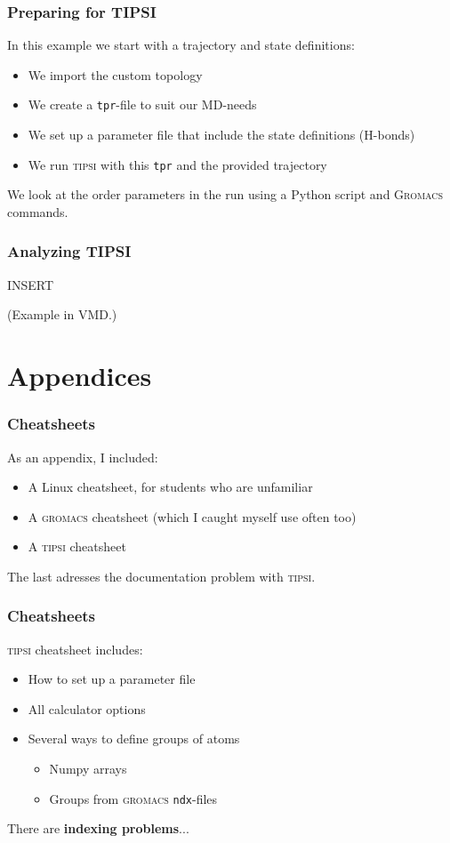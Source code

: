 \documentclass[hyperref={pdfpagelabels=false}]{beamer}
\begin{document}
\begin{frame}
\frametitle{Preparing for \textsc{TIPSI}} 
In this example we start with a trajectory and state definitions:
\begin{itemize}
\item We import the custom topology
\item We create a \texttt{tpr}-file to suit our MD-needs
\item We set up a parameter file that include the state definitions (H-bonds)
\item We run \textsc{tipsi} with this \texttt{tpr} and the provided trajectory
\end{itemize}
We look at the order parameters in the run using a Python script and \textsc{Gromacs} commands.
\end{frame}

\begin{frame}
\frametitle{Analyzing \textsc{TIPSI}}
INSERT

(Example in VMD.) 
\end{frame}

\section{Appendices}
\setcounter{subsection}{1}

\begin{frame}
\frametitle{Cheatsheets}
As an appendix, I included:
\begin{itemize}
\item A Linux cheatsheet, for students who are unfamiliar
\item A \textsc{gromacs} cheatsheet (which I caught myself use often too)
\item A \textsc{tipsi} cheatsheet
\end{itemize}
The last adresses the documentation problem with \textsc{tipsi}.
\end{frame}

\begin{frame}
\frametitle{Cheatsheets}
\textsc{tipsi} cheatsheet includes:
\begin{itemize}
\item How to set up a parameter file
\item All calculator options
\item Several ways to define groups of atoms
\begin{itemize}
\item Numpy arrays
\item Groups from \textsc{gromacs} \texttt{ndx}-files
\end{itemize}
\end{itemize}
There are \textbf{indexing problems}...
\end{frame}
\end{document}
